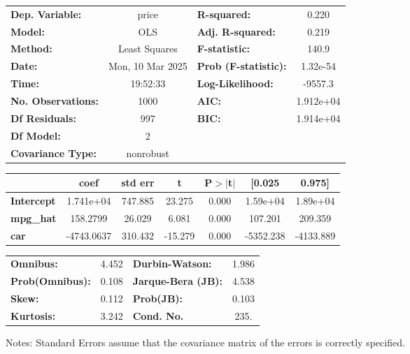 \begin{center}
\begin{tabular}{lclc}
\toprule
\textbf{Dep. Variable:}    &      price       & \textbf{  R-squared:         } &     0.220   \\
\textbf{Model:}            &       OLS        & \textbf{  Adj. R-squared:    } &     0.219   \\
\textbf{Method:}           &  Least Squares   & \textbf{  F-statistic:       } &     140.9   \\
\textbf{Date:}             & Mon, 10 Mar 2025 & \textbf{  Prob (F-statistic):} &  1.32e-54   \\
\textbf{Time:}             &     19:52:33     & \textbf{  Log-Likelihood:    } &   -9557.3   \\
\textbf{No. Observations:} &        1000      & \textbf{  AIC:               } & 1.912e+04   \\
\textbf{Df Residuals:}     &         997      & \textbf{  BIC:               } & 1.914e+04   \\
\textbf{Df Model:}         &           2      & \textbf{                     } &             \\
\textbf{Covariance Type:}  &    nonrobust     & \textbf{                     } &             \\
\bottomrule
\end{tabular}
\begin{tabular}{lcccccc}
                   & \textbf{coef} & \textbf{std err} & \textbf{t} & \textbf{P$> |$t$|$} & \textbf{[0.025} & \textbf{0.975]}  \\
\midrule
\textbf{Intercept} &    1.741e+04  &      747.885     &    23.275  &         0.000        &     1.59e+04    &     1.89e+04     \\
\textbf{mpg\_hat}  &     158.2799  &       26.029     &     6.081  &         0.000        &      107.201    &      209.359     \\
\textbf{car}       &   -4743.0637  &      310.432     &   -15.279  &         0.000        &    -5352.238    &    -4133.889     \\
\bottomrule
\end{tabular}
\begin{tabular}{lclc}
\textbf{Omnibus:}       &  4.452 & \textbf{  Durbin-Watson:     } &    1.986  \\
\textbf{Prob(Omnibus):} &  0.108 & \textbf{  Jarque-Bera (JB):  } &    4.538  \\
\textbf{Skew:}          &  0.112 & \textbf{  Prob(JB):          } &    0.103  \\
\textbf{Kurtosis:}      &  3.242 & \textbf{  Cond. No.          } &     235.  \\
\bottomrule
\end{tabular}
\end{center}

Notes: \newline
 [1] Standard Errors assume that the covariance matrix of the errors is correctly specified.